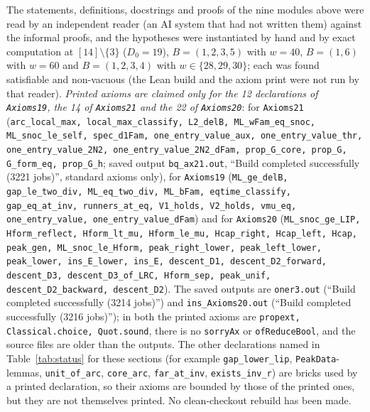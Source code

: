 \documentclass[11pt]{article}
\theoremstyle{definition}
\theoremstyle{remark}
\begin{document}
{\sloppy The statements, definitions, docstrings and proofs of the nine modules above were read by an independent reader (an AI system that had not written them) against the informal proofs, and the hypotheses were instantiated by hand and by exact computation at $[14]\setminus\{3\}$ ($D_0=19$), $B=(1,2,3,5)$ with $w=40$, $B=(1,6)$ with $w=60$ and $B=(1,2,3,4)$ with $w\in\{28,29,30\}$; each was found satisfiable and non-vacuous (the Lean build and the axiom print were not run by that reader). \emph{Printed axioms are claimed only for the 12 declarations of \texttt{Axioms19}, the 14 of \texttt{Axioms21} and the 22 of \texttt{Axioms20}}: for \texttt{Axioms21} (\texttt{arc\_local\_max, local\_max\_classify, L2\_delB, ML\_wFam\_eq\_snoc, ML\_snoc\_le\_self, spec\_d1Fam, one\_entry\_value\_aux, one\_entry\_value\_thr, one\_entry\_value\_2N2, one\_entry\_value\_2N2\_dFam, prop\_G\_core, prop\_G, G\_form\_eq, prop\_G\_h}; saved output \texttt{bq\_ax21.out}, ``Build completed successfully (3221 jobs)'', standard axioms only), for \texttt{Axioms19} (\texttt{ML\_ge\_delB, gap\_le\_two\_div, ML\_eq\_two\_div, ML\_bFam, eqtime\_classify, gap\_eq\_at\_inv, runners\_at\_eq, V1\_holds, V2\_holds, vmu\_eq, one\_entry\_value, one\_entry\_value\_dFam}) and for \texttt{Axioms20} (\texttt{ML\_snoc\_ge\_LIP, Hform\_reflect, Hform\_lt\_mu, Hform\_le\_mu, Hcap\_right, Hcap\_left, Hcap, peak\_gen, ML\_snoc\_le\_Hform, peak\_right\_lower, peak\_left\_lower, peak\_lower, ins\_E\_lower, ins\_E, descent\_D1, descent\_D2\_forward, descent\_D3, descent\_D3\_of\_LRC, Hform\_sep, peak\_unif, descent\_D2\_backward, descent\_D2}). The saved outputs are \texttt{oner3.out} (``Build completed successfully (3214 jobs)'') and \texttt{ins\_Axioms20.out} (``Build completed successfully (3216 jobs)''); in both the printed axioms are \texttt{propext, Classical.choice, Quot.sound}, there is no \texttt{sorryAx} or \texttt{ofReduceBool}, and the source files are older than the outputs. The other declarations named in Table~\ref{tab:status} for these sections (for example \texttt{gap\_lower\_lip}, \texttt{PeakData}-lemmas, \texttt{unit\_of\_arc}, \texttt{core\_arc}, \texttt{far\_at\_inv}, \texttt{exists\_inv\_r}) are bricks used by a printed declaration, so their axioms are bounded by those of the printed ones, but they are not themselves printed. No clean-checkout rebuild has been made.\par}

\end{document}
